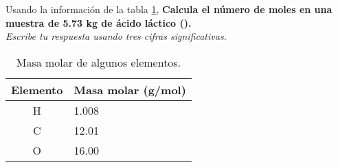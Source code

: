 Usando la información de la tabla \ref{tab:q001},
\textbf{Calcula el número de moles en una muestra de 5.73 kg de ácido láctico ().}\\
\emph{Escribe tu respuesta usando tres cifras significativas.}

\begin{multicols}{2}
    \begin{table}[H]
        \centering
        \caption{Masa molar de algunos elementos.}
        \label{tab:q001}
        \begin{tabular}{c|p{2.2cm}}
            \textbf{Elemento} & \textbf{Masa molar (g/mol)} \\\midrule
            H                 & 1.008                       \\\hline
            C                 & 12.01                       \\\hline
            O                 & 16.00                       \\\hline
            \bottomrule
        \end{tabular}
    \end{table}

    \columnbreak

    \begin{solutionbox}{7cm}
    \end{solutionbox}
\end{multicols}